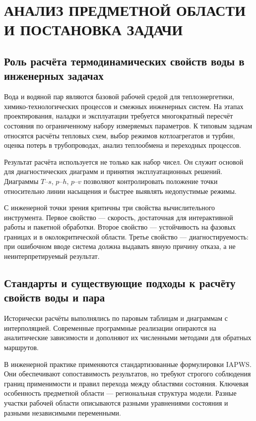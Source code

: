 \chapter{АНАЛИЗ ПРЕДМЕТНОЙ ОБЛАСТИ И ПОСТАНОВКА ЗАДАЧИ}

\section{Роль расчёта термодинамических свойств воды в инженерных задачах}

Вода и водяной пар являются базовой рабочей средой для теплоэнергетики,
химико-технологических процессов и смежных инженерных систем.
На этапах проектирования, наладки и эксплуатации требуется многократный пересчёт
состояния по ограниченному набору измеряемых параметров.
К типовым задачам относятся расчёты тепловых схем, выбор режимов котлоагрегатов и турбин,
оценка потерь в трубопроводах, анализ теплообмена и переходных процессов.

Результат расчёта используется не только как набор чисел.
Он служит основой для диагностических диаграмм и принятия эксплуатационных решений.
Диаграммы $T$--$s$, $p$--$h$, $p$--$v$ позволяют контролировать положение точки
относительно линии насыщения и быстрее выявлять недопустимые режимы.

С инженерной точки зрения критичны три свойства вычислительного инструмента.
Первое свойство --- скорость, достаточная для интерактивной работы и пакетной обработки.
Второе свойство --- устойчивость на фазовых границах и в околокритической области.
Третье свойство --- диагностируемость: при ошибочном вводе система должна выдавать
явную причину отказа, а не неинтерпретируемый результат.

\section{Стандарты и существующие подходы к расчёту свойств воды и пара}

Исторически расчёты выполнялись по паровым таблицам и диаграммам с интерполяцией.
Современные программные реализации опираются на аналитические зависимости
и дополняют их численными методами для обратных маршрутов.

В инженерной практике применяются стандартизованные формулировки IAPWS.
Они обеспечивают сопоставимость результатов, но требуют строгого соблюдения
границ применимости и правил перехода между областями состояния.
Ключевая особенность предметной области --- региональная структура модели.
Разные участки рабочей области описываются разными уравнениями состояния
и разными независимыми переменными.

